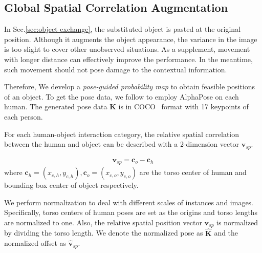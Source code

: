 \documentclass[10pt,twocolumn,letterpaper]{article}
\begin{document}
\subsection{Global Spatial Correlation Augmentation}
\label{sec:pose-guided}
In Sec.\ref{sec:object exchange}, the substituted object is pasted at the original position. Although it augments the object appearance, the variance in the image is too slight to cover other unobserved situations. As a supplement, movement with longer distance can effectively improve the performance. In the meantime, such movement should not pose damage to the contextual information.

Therefore, We develop a \textit{pose-guided probability map} to obtain feasible positions of an object. To get the pose data, we follow \cite{li2019transferable} to employ AlphaPose \cite{fang2017rmpe,li2019crowdpose} on each human. The generated pose data $\mathbf{K}$ is in COCO~\cite{lin2014microsoft} format with 17 keypoints of each person.

For each human-object interaction category, the relative spatial correlation between the human and object can be described with a 2-dimension vector $\textbf{v}_{sp}$.

\begin{align}
    \textbf{v}_{sp} = \textbf{c}_o-\textbf{c}_h
\end{align}
where $\textbf{c}_h=(x_{c,h},y_{c,h}),\textbf{c}_o=(x_{c,o},y_{c,o})$ are the torso center of human and bounding box center of object respectively.

We perform normalization to deal with different scales of instances and images. Specifically, torso centers of human poses are set as the origins and torso lengths are normalized to one. Also, the relative spatial position vector $\textbf{v}_{sp}$ is normalized by dividing the torso length. We denote the normalized pose as $\hat{\mathbf{K}}$ and the normalized offset as $\hat{\mathbf{v}}_{sp}$.
\end{document}
